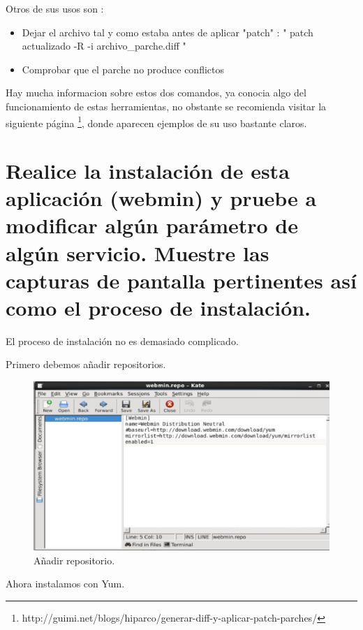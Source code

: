 Otros de sus usos son :

\begin{itemize}
\item Dejar el archivo tal y como estaba antes de aplicar "patch" : " patch actualizado -R -i archivo\_parche.diff "
\item Comprobar que el parche no produce conflictos
\end{itemize}


Hay mucha informacion sobre estos dos comandos, ya conocia algo del funcionamiento de estas herramientas, no obstante se recomienda visitar la siguiente página \footnote{http://guimi.net/blogs/hiparco/generar-diff-y-aplicar-patch-parches/ }, donde aparecen ejemplos de su uso bastante claros.



\section{ Realice la instalación de esta aplicación (webmin) y pruebe a modificar algún parámetro de algún servicio. Muestre las capturas de pantalla pertinentes así como el proceso de instalación. }

El proceso de instalación no es demasiado complicado.

Primero debemos añadir repositorios.

\begin{figure}[H]
\begin{center}
\includegraphics[scale=0.4]{Imagenes/pregunta15-1.eps}
\caption{Añadir repositorio.}
\end{center}
\end{figure}

Ahora instalamos con Yum.

